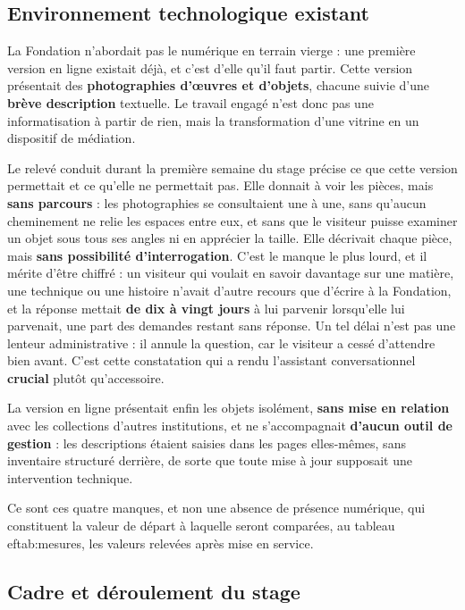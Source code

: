 \subsection{Environnement technologique existant}

La Fondation n'abordait pas le numérique en terrain vierge : une première
version en ligne existait déjà, et c'est d'elle qu'il faut partir. Cette version
présentait des \textbf{photographies d'œuvres et d'objets}, chacune suivie d'une
\textbf{brève description} textuelle. Le travail engagé n'est donc pas une
informatisation à partir de rien, mais la transformation d'une vitrine en un
dispositif de médiation.

Le relevé conduit durant la première semaine du stage précise ce que cette
version permettait et ce qu'elle ne permettait pas. Elle donnait à voir les
pièces, mais \textbf{sans parcours} : les photographies se consultaient une à
une, sans qu'aucun cheminement ne relie les espaces entre eux, et sans que le
visiteur puisse examiner un objet sous tous ses angles ni en apprécier la taille.
Elle décrivait chaque pièce, mais \textbf{sans possibilité d'interrogation}.
C'est le manque le plus lourd, et il mérite d'être chiffré : un visiteur qui
voulait en savoir davantage sur une matière, une technique ou une histoire
n'avait d'autre recours que d'écrire à la Fondation, et la réponse mettait
\textbf{de dix à vingt jours} à lui parvenir lorsqu'elle lui parvenait, une part
des demandes restant sans réponse. Un tel délai n'est pas une lenteur
administrative : il annule la question, car le visiteur a cessé d'attendre bien
avant. C'est cette constatation qui a rendu l'assistant conversationnel
\textbf{crucial} plutôt qu'accessoire.

La version en ligne présentait enfin les objets isolément, \textbf{sans mise en
relation} avec les collections d'autres institutions, et ne s'accompagnait
\textbf{d'aucun outil de gestion} : les descriptions étaient saisies dans les
pages elles-mêmes, sans inventaire structuré derrière, de sorte que toute mise à
jour supposait une intervention technique.

Ce sont ces quatre manques, et non une absence de présence numérique, qui
constituent la valeur de départ à laquelle seront comparées, au
tableau~
ef{tab:mesures}, les valeurs relevées après mise en service.


\subsection{Cadre et déroulement du stage}
\label{sec:stage}

